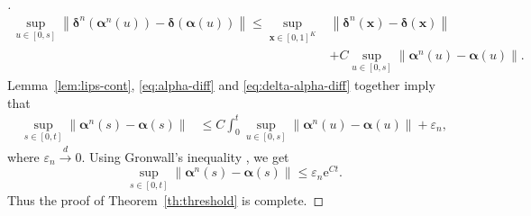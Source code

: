 \documentclass[11pt,a4paper, reqno]{article}
\begin{document}
\begin{proof}[\nopunct]
\begin{equation}
 \begin{split}\label{eq:delta-alpha-diff}
  \sup_{u\in [0,s]}{\ensuremath{\left\|{{\ensuremath{\boldsymbol{{\delta}}}}^n({\ensuremath{\boldsymbol{{\alpha}}}}^n(u))-{\ensuremath{\boldsymbol{{\delta}}}}({\ensuremath{\boldsymbol{{\alpha}}}}(u))}\right\|}}\leq \sup_{{\ensuremath{\boldsymbol{{x}}}}\in [0,1]^K}&{\ensuremath{\left\|{{\ensuremath{\boldsymbol{{\delta}}}}^n({\ensuremath{\boldsymbol{{x}}}})-{\ensuremath{\boldsymbol{{\delta}}}}({\ensuremath{\boldsymbol{{x}}}})}\right\|}}\\
  & + C\sup_{u\in [0,s]} {\ensuremath{\left\|{{\ensuremath{\boldsymbol{{\alpha}}}}^n(u)-{\ensuremath{\boldsymbol{{\alpha}}}}(u)}\right\|}}.
 \end{split}
\end{equation}
Lemma~\ref{lem:lips-cont}, \eqref{eq:alpha-diff} and \eqref{eq:delta-alpha-diff} together imply that
\begin{equation}
 \begin{split}
  \sup_{s\in [0,t]}{\ensuremath{\left\|{{\ensuremath{\boldsymbol{{\alpha}}}}^n(s)-{\ensuremath{\boldsymbol{{\alpha}}}}(s)}\right\|}}&\leq  C\int_0^t\sup_{u\in [0,s]} {\ensuremath{\left\|{{\ensuremath{\boldsymbol{{\alpha}}}}^n(u)-{\ensuremath{\boldsymbol{{\alpha}}}}(u)}\right\|}}+ \varepsilon_n,
 \end{split}
\end{equation}
where $\varepsilon_n{\ensuremath{\xrightarrow{d}}} 0$.
Using Gronwall's inequality \cite[Proposition 6.1.4]{ODE_martin}, we get
\begin{equation}
 \sup_{s\in [0,t]}{\ensuremath{\left\|{{\ensuremath{\boldsymbol{{\alpha}}}}^n(s)-{\ensuremath{\boldsymbol{{\alpha}}}}(s)}\right\|}}\leq  \varepsilon_n {\ensuremath{\mathrm{e}}}^{Ct}.
\end{equation}
Thus the proof of Theorem~\ref{th:threshold} is complete.
\end{proof}
\end{document}
